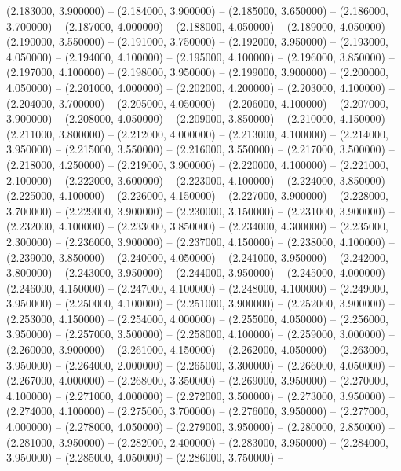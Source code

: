 (2.183000, 3.900000) -- 
(2.184000, 3.900000) -- 
(2.185000, 3.650000) -- 
(2.186000, 3.700000) -- 
(2.187000, 4.000000) -- 
(2.188000, 4.050000) -- 
(2.189000, 4.050000) -- 
(2.190000, 3.550000) -- 
(2.191000, 3.750000) -- 
(2.192000, 3.950000) -- 
(2.193000, 4.050000) -- 
(2.194000, 4.100000) -- 
(2.195000, 4.100000) -- 
(2.196000, 3.850000) -- 
(2.197000, 4.100000) -- 
(2.198000, 3.950000) -- 
(2.199000, 3.900000) -- 
(2.200000, 4.050000) -- 
(2.201000, 4.000000) -- 
(2.202000, 4.200000) -- 
(2.203000, 4.100000) -- 
(2.204000, 3.700000) -- 
(2.205000, 4.050000) -- 
(2.206000, 4.100000) -- 
(2.207000, 3.900000) -- 
(2.208000, 4.050000) -- 
(2.209000, 3.850000) -- 
(2.210000, 4.150000) -- 
(2.211000, 3.800000) -- 
(2.212000, 4.000000) -- 
(2.213000, 4.100000) -- 
(2.214000, 3.950000) -- 
(2.215000, 3.550000) -- 
(2.216000, 3.550000) -- 
(2.217000, 3.500000) -- 
(2.218000, 4.250000) -- 
(2.219000, 3.900000) -- 
(2.220000, 4.100000) -- 
(2.221000, 2.100000) -- 
(2.222000, 3.600000) -- 
(2.223000, 4.100000) -- 
(2.224000, 3.850000) -- 
(2.225000, 4.100000) -- 
(2.226000, 4.150000) -- 
(2.227000, 3.900000) -- 
(2.228000, 3.700000) -- 
(2.229000, 3.900000) -- 
(2.230000, 3.150000) -- 
(2.231000, 3.900000) -- 
(2.232000, 4.100000) -- 
(2.233000, 3.850000) -- 
(2.234000, 4.300000) -- 
(2.235000, 2.300000) -- 
(2.236000, 3.900000) -- 
(2.237000, 4.150000) -- 
(2.238000, 4.100000) -- 
(2.239000, 3.850000) -- 
(2.240000, 4.050000) -- 
(2.241000, 3.950000) -- 
(2.242000, 3.800000) -- 
(2.243000, 3.950000) -- 
(2.244000, 3.950000) -- 
(2.245000, 4.000000) -- 
(2.246000, 4.150000) -- 
(2.247000, 4.100000) -- 
(2.248000, 4.100000) -- 
(2.249000, 3.950000) -- 
(2.250000, 4.100000) -- 
(2.251000, 3.900000) -- 
(2.252000, 3.900000) -- 
(2.253000, 4.150000) -- 
(2.254000, 4.000000) -- 
(2.255000, 4.050000) -- 
(2.256000, 3.950000) -- 
(2.257000, 3.500000) -- 
(2.258000, 4.100000) -- 
(2.259000, 3.000000) -- 
(2.260000, 3.900000) -- 
(2.261000, 4.150000) -- 
(2.262000, 4.050000) -- 
(2.263000, 3.950000) -- 
(2.264000, 2.000000) -- 
(2.265000, 3.300000) -- 
(2.266000, 4.050000) -- 
(2.267000, 4.000000) -- 
(2.268000, 3.350000) -- 
(2.269000, 3.950000) -- 
(2.270000, 4.100000) -- 
(2.271000, 4.000000) -- 
(2.272000, 3.500000) -- 
(2.273000, 3.950000) -- 
(2.274000, 4.100000) -- 
(2.275000, 3.700000) -- 
(2.276000, 3.950000) -- 
(2.277000, 4.000000) -- 
(2.278000, 4.050000) -- 
(2.279000, 3.950000) -- 
(2.280000, 2.850000) -- 
(2.281000, 3.950000) -- 
(2.282000, 2.400000) -- 
(2.283000, 3.950000) -- 
(2.284000, 3.950000) -- 
(2.285000, 4.050000) -- 
(2.286000, 3.750000) -- 
